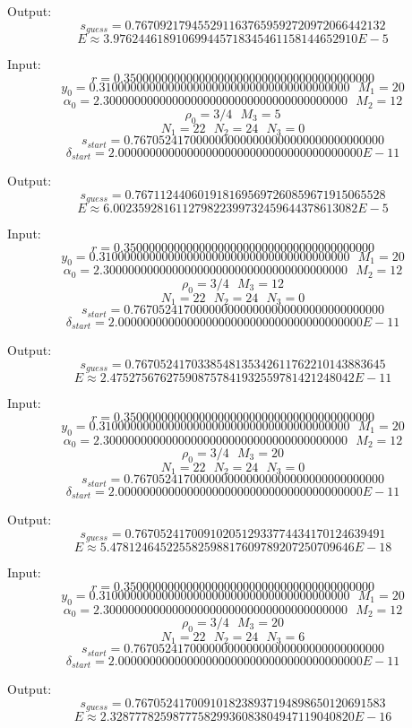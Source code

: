 \documentclass[]{article}
\begin{document}
Output:
$$
s_{guess} = 0.7670921794552911637659592720972066442132 $$$$
E \approx 3.976244618910699445718345461158144652910 E-5
$$

Input:
$$
r = 0.3500000000000000000000000000000000000000 $$$$
y_0 = 0.3100000000000000000000000000000000000000 ~~~ M_1 = 20 $$$$
\alpha_0 = 2.300000000000000000000000000000000000000 ~~~ M_2 = 12 $$$$
\rho_0 = 3/4 ~~~ M_3 = 5 $$$$
N_1 = 22 ~~~ N_2 = 24 ~~~ N_3 = 0 $$$$
s_{start} = 0.7670524170000000000000000000000000000000 $$$$
\delta_{start} = 2.000000000000000000000000000000000000000 E-11
$$

Output:
$$
s_{guess} = 0.7671124406019181695697260859671915065528 $$$$
E \approx 6.002359281611279822399732459644378613082 E-5
$$

Input:
$$
r = 0.3500000000000000000000000000000000000000 $$$$
y_0 = 0.3100000000000000000000000000000000000000 ~~~ M_1 = 20 $$$$
\alpha_0 = 2.300000000000000000000000000000000000000 ~~~ M_2 = 12 $$$$
\rho_0 = 3/4 ~~~ M_3 = 12 $$$$
N_1 = 22 ~~~ N_2 = 24 ~~~ N_3 = 0 $$$$
s_{start} = 0.7670524170000000000000000000000000000000 $$$$
\delta_{start} = 2.000000000000000000000000000000000000000 E-11
$$

Output:
$$
s_{guess} = 0.7670524170338548135342611762210143883645 $$$$
E \approx 2.475275676275908757841932559781421248042 E-11
$$

Input:
$$
r = 0.3500000000000000000000000000000000000000 $$$$
y_0 = 0.3100000000000000000000000000000000000000 ~~~ M_1 = 20 $$$$
\alpha_0 = 2.300000000000000000000000000000000000000 ~~~ M_2 = 12 $$$$
\rho_0 = 3/4 ~~~ M_3 = 20 $$$$
N_1 = 22 ~~~ N_2 = 24 ~~~ N_3 = 0 $$$$
s_{start} = 0.7670524170000000000000000000000000000000 $$$$
\delta_{start} = 2.000000000000000000000000000000000000000 E-11
$$

Output:
$$
s_{guess} = 0.7670524170091020512933774434170124639491 $$$$
E \approx 5.478124645225582598817609789207250709646 E-18
$$

Input:
$$
r = 0.3500000000000000000000000000000000000000 $$$$
y_0 = 0.3100000000000000000000000000000000000000 ~~~ M_1 = 20 $$$$
\alpha_0 = 2.300000000000000000000000000000000000000 ~~~ M_2 = 12 $$$$
\rho_0 = 3/4 ~~~ M_3 = 20 $$$$
N_1 = 22 ~~~ N_2 = 24 ~~~ N_3 = 6 $$$$
s_{start} = 0.7670524170000000000000000000000000000000 $$$$
\delta_{start} = 2.000000000000000000000000000000000000000 E-11
$$

Output:
$$
s_{guess} = 0.7670524170091018238937194898650120691583 $$$$
E \approx 2.328777825987775829936083804947119040820 E-16
$$
\end{document}
